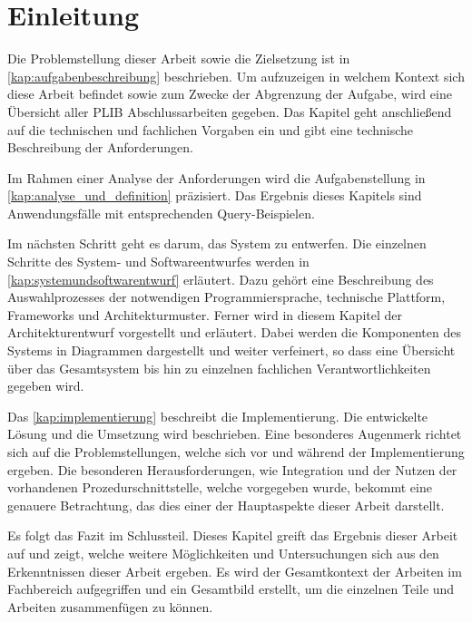 
\chapter{Einleitung}\label{sec:einleitung}

Die Problemstellung dieser Arbeit sowie die Zielsetzung ist in \autoref{kap:aufgabenbeschreibung} beschrieben. Um aufzuzeigen in welchem Kontext sich diese Arbeit befindet sowie zum Zwecke der Abgrenzung der Aufgabe, wird eine Übersicht aller PLIB Abschlussarbeiten gegeben. Das Kapitel geht anschließend auf die technischen und fachlichen Vorgaben ein und gibt eine technische Beschreibung der Anforderungen.

Im Rahmen einer Analyse der Anforderungen wird die Aufgabenstellung in \autoref{kap:analyse_und_definition} präzisiert. Das Ergebnis dieses Kapitels sind Anwendungsfälle mit entsprechenden Query-Beispielen. 

Im nächsten Schritt geht es darum, das System zu entwerfen. Die einzelnen Schritte des System- und Softwareentwurfes werden in \autoref{kap:systemundsoftwarentwurf} erläutert. Dazu gehört eine Beschreibung des Auswahlprozesses der notwendigen Programmiersprache, technische Plattform, Frameworks und Architekturmuster. 
Ferner wird in diesem Kapitel der Architekturentwurf vorgestellt und erläutert. Dabei werden die Komponenten des Systems in Diagrammen dargestellt und weiter verfeinert, so dass eine Übersicht über das Gesamtsystem bis hin zu einzelnen fachlichen Verantwortlichkeiten gegeben wird. 

Das \autoref{kap:implementierung} beschreibt die Implementierung. Die entwickelte Lösung und die Umsetzung wird beschrieben. Eine besonderes Augenmerk richtet sich auf die Problemstellungen, welche sich vor und während der Implementierung ergeben. Die besonderen Herausforderungen, wie Integration und der Nutzen der vorhandenen Prozedurschnittstelle, welche vorgegeben wurde, bekommt eine genauere Betrachtung, das dies einer der Hauptaspekte dieser Arbeit darstellt.

Es folgt das Fazit im Schlussteil. Dieses Kapitel greift das Ergebnis dieser Arbeit auf und zeigt, welche weitere Möglichkeiten und Untersuchungen sich aus den Erkenntnissen dieser Arbeit ergeben. Es wird der Gesamtkontext der Arbeiten im Fachbereich aufgegriffen und ein Gesamtbild erstellt, um die einzelnen Teile und Arbeiten zusammenfügen zu können. 